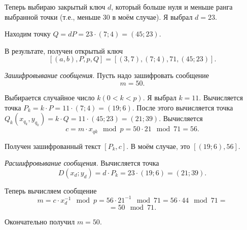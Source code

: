 \documentclass[10pt]{article}
\begin{document}
Теперь выбираю закрытый ключ $d$, который больше нуля и меньше ранга выбранной точки (т.е., меньше 30 в моём случае). Я выбрал $d = 23$.

Находим точку $Q = dP = 23 \cdot (7; 4) = (45; 23)$.

В результате, получен открытый ключ
$$[(a, b), P, p, Q] = [(3,7), (7;4), 71, (45; 23)].$$

\emph{Зашифровывание сообщения}. Пусть надо зашифровать сообщение
$$m = 50.$$

Выбирается случайное число $k (0 < k < p)$. Я выбрал $k = 11$. Вычисляется точка $P_k = k \cdot P = 11 \cdot (7;4) = (19; 6)$. После этого вычисляется точка $Q_k(x_{q_k}, y_{q_k}) = k \cdot Q = 11 \cdot (45; 23) = (21; 39)$. Вычисляется
$$c = m \cdot x_{qk} \mod p = 50 \cdot 21 \mod 71 = 56.$$

Получен зашифрованный текст $[P_k, c]$. В моём случае, это $[(19; 6), 56]$.

\emph{Расшифровывание сообщения}. Вычисляется точка
$$D(x_d; y_d) = d \cdot P_k = 23 \cdot (19; 6) = (21; 39).$$

Теперь вычисляем сообщение
$$m = c \cdot x_d^{-1} \mod p = 56 \cdot 21^{-1} \mod 71 = 56 \cdot 44 \mod 71 =$$
$$= 50 \mod 71.$$

Окончательно получил $m = 50$.
\end{document}
